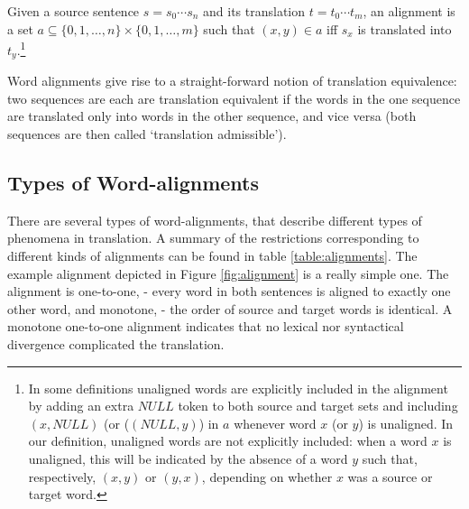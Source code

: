 \begin{definition}\label{def:alignment}
Given a source sentence $s = s_0 \cdots s_n$ and its translation $t = t_0 \cdots t_m$, an alignment is a set $a \subseteq \{0,1,\ldots,n\} \times \{0,1,\ldots,m\}$ such that $(x,y)\in a$ iff $s_x$ is translated into $t_y$.\footnote{In some definitions unaligned words are explicitly included in the alignment by adding an extra $NULL$ token to both source and target sets and including $(x,NULL)$ (or ($(NULL,y)$) in $a$ whenever word $x$ (or $y$) is unaligned. In our definition, unaligned words are not explicitly included: when a word $x$ is unaligned, this will be indicated by the absence of a word $y$ such that, respectively, $(x,y)$ or $(y,x)$, depending on whether $x$ was a source or target word.}
\end{definition}

Word alignments give rise to a straight-forward notion of translation equivalence: two sequences are each are translation equivalent if the words in the one sequence are translated only into words in the other sequence, and vice versa (both sequences are then called `translation admissible'). 

\subsection{Types of Word-alignments}
\label{subsec:types_alignments}

There are several types of word-alignments, that describe different types of phenomena in translation. A summary of the restrictions corresponding to different kinds of alignments can be found in table \ref{table:alignments}. The example alignment depicted in Figure \ref{fig:alignment} is a really simple one. The alignment is one-to-one, - every word in both sentences is aligned to exactly one other word, and monotone, - the order of source and target words is identical. A monotone one-to-one alignment indicates that no lexical nor syntactical divergence complicated the translation.

